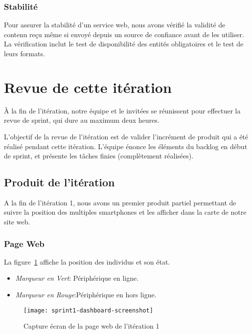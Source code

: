 \subsubsection{Stabilité}

Pour assurer la stabilité d'un service web, nous avons vérifié la validité de
contenu reçu même si envoyé depuis un source de confiance avant de les
utiliser. La vérification inclut le test de disponibilité des entités
obligatoires et le test de leurs formats.

\section{Revue de cette itération}

À la fin de l'itération, notre équipe et le  invitées
se réunissent pour effectuer la revue de sprint, qui dure au maximum deux
heures.

L'objectif de la revue de l'itération est de valider l'incrément de produit qui
a été réalisé pendant cette itération. L'équipe énonce les éléments du backlog
en début de sprint, et présente les tâches finies (complètement réalisées).

\subsection{Produit de l'itération}

A la fin de l'itération 1, nous avons un premier produit partiel permettant de
suivre la position des multiples smartphones et les afficher dans la carte de
notre site web.

\subsubsection{Page Web }

La figure~\ref{fig:sprint1-dashboard-screenshot} affiche la position des
individus et son état.

\begin{itemize}
    \item \textit{Marqueur en Vert}: Périphérique en ligne.
    \item \textit{Marqueur en Rouge}:Périphérique en hors ligne.
\end{itemize}

\begin{figure}[H]
    \centering
    \texttt{[image: sprint1-dashboard-screenshot]}
    \caption{Capture écran de la page web de l'itération 1}
\label{fig:sprint1-dashboard-screenshot}
\end{figure}

